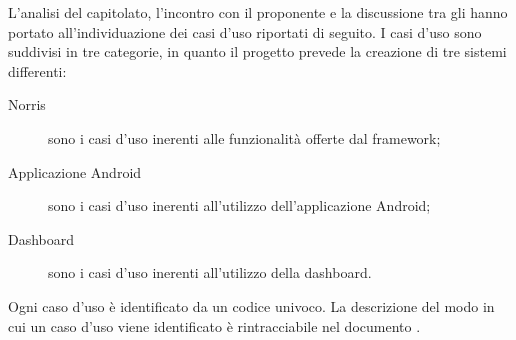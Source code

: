 L’analisi del capitolato, l’incontro con il proponente e la discussione tra gli  hanno portato all'individuazione dei casi d'uso riportati di seguito. 
I casi d'uso sono suddivisi in tre categorie, in quanto il progetto prevede la creazione di tre sistemi differenti:
\begin{description}
	\item[Norris] sono i casi d'uso inerenti alle funzionalità offerte dal framework;
	\item[Applicazione Android] sono i casi d'uso inerenti all'utilizzo dell'applicazione Android;
	\item[Dashboard] sono i casi d'uso inerenti all'utilizzo della dashboard.
\end{description}
Ogni caso d'uso è identificato da un codice univoco. La descrizione del modo in cui un caso d'uso viene identificato  è rintracciabile nel documento .





